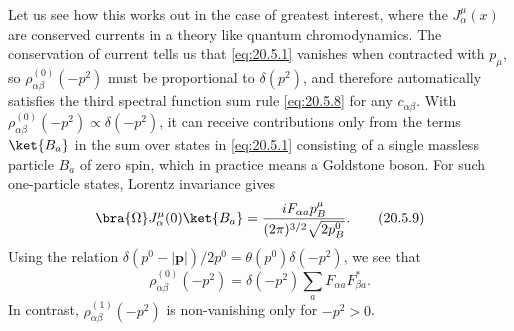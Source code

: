 Let us see how this works out in the case of greatest interest, where the $J_\alpha^\mu(x)$ are conserved currents in a theory like quantum chromodynamics. The conservation of current tells us that \eqref{eq:20.5.1} vanishes when contracted with $p_\mu$, so $\rho_{\alpha\beta}^{(0)}(-p^2)$ must be proportional to $\delta(p^2)$, and therefore automatically satisfies the third spectral function sum rule \eqref{eq:20.5.8} for any $c_{\alpha\beta}$. With $\rho_{\alpha\beta}^{(0)}(-p^2)\propto\delta(-p^2)$, it can receive contributions only from the terms $\ket{B_a}$ in the sum over states in \eqref{eq:20.5.1} consisting of a single massless particle $B_a$ of zero spin, which in practice means a Goldstone boson. For such one-particle states, Lorentz invariance gives
\begin{equation}
\bra{\Omega}J_\alpha^\mu(0)\ket{B_a}
=\frac{iF_{\alpha a}p_B^\mu}{(2\pi)^{3/2}\sqrt{2p_B^0}}.
\tag{20.5.9}\label{eq:20.5.9}
\end{equation}
Using the relation $\delta(p^0-|\mathbf p|)/2p^0=\theta(p^0)\delta(-p^2)$, we see that
\begin{equation}
\rho_{\alpha\beta}^{(0)}(-p^2)
=\delta(-p^2)\sum_a F_{\alpha a}F_{\beta a}^*.
\tag{20.5.10}\label{eq:20.5.10}
\end{equation}
In contrast, $\rho_{\alpha\beta}^{(1)}(-p^2)$ is non-vanishing only for $-p^2>0$.

